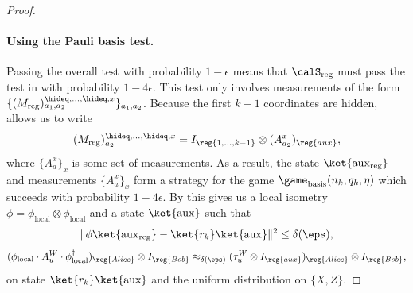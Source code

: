 \begin{proof}
\paragraph{Using the Pauli basis test.}
Passing the overall test with probability $1-\epsilon$
means that $\calS_{\mathrm{reg}}$ must pass the test in  with probability $1-4\epsilon$.
This test only involves measurements of the form $\{(M_{\mathrm{reg}})^{\hideq,\ldots, \hideq, x}_{a_1, a_2}\}_{a_1, a_2}$.
Because the first $k-1$ coordinates are hidden,  allows us to write
\begin{equation*}
(M_{\mathrm{reg}})^{\hideq, \ldots, \hideq, x}_{a_2} = I_{\reg{1, \ldots, k-1}} \otimes (A^x_{a_2})_{\reg{aux}},
\end{equation*}
where $\{A^x_a\}_x$ is some set of measurements.
As a result, the state $\ket{\mathrm{aux}_{\mathrm{reg}}}$ and measurements $\{A^x_a\}_x$ form a strategy 
for the game $\game_{\mathrm{basis}}(n_k, q_k, \eta)$ which succeeds with probability $1-4\epsilon$.
By  this gives us a local isometry
$\phi = \phi_{\mathrm{local}}\otimes \phi_{\mathrm{local}}$ and a state $\ket{\mathrm{aux}}$ such that
\begin{equation}\label{eq:applied-that-fact}
\Vert \phi \ket{\mathrm{aux}_{\mathrm{reg}}} - \ket{r_k} \ket{\mathrm{aux}} \Vert^2 \leq \delta(\eps),
\end{equation}
\begin{equation}\label{eq:applied-that-fact-dos}
(\phi_{\mathrm{local}}\cdot A_{u}^{W} \cdot \phi_{\mathrm{local}}^\dagger)_{\reg{Alice}}\otimes I_{\reg{Bob}}
\approx_{\delta(\eps)}
(\tau_{u}^{W} \otimes I_{\reg{aux}})_{\reg{Alice}} \otimes I_{\reg{Bob}},
\end{equation}
on state $\ket{r_k} \ket{\mathrm{aux}}$ and the uniform distribution on $\{X,Z\}$.


\end{proof}

